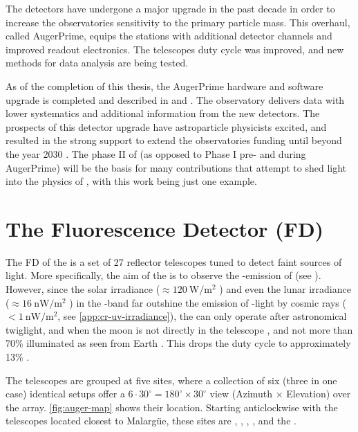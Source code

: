 The detectors have undergone a major upgrade in the past decade in order to 
increase the observatories sensitivity to the primary particle mass. This 
overhaul, called AugerPrime, equips the \SD stations with additional detector 
channels and improved readout electronics. The \FD telescopes duty cycle was 
improved, and new methods for data analysis are being tested.

As of the completion of this thesis, the AugerPrime hardware and software 
upgrade is completed and described in  and 
\cite{collaborationPierreAugerObservatory2011}. The observatory delivers data 
with lower systematics and additional information from the new detectors. The 
prospects of this detector upgrade have astroparticle physicists excited, and 
resulted in the strong support to extend the observatories funding until beyond
the year 2030 \cite{castellinaOutcomeFinanceBoard2023}. The phase II of \DAQ (as
opposed to Phase I pre- and during AugerPrime) will be the basis for many 
contributions that attempt to shed light into the physics of \UHECRs, with this 
work being just one example.

\section{The Fluorescence Detector (FD)}
\label{sesee}

The \acf{FD} of the \PAO is a set of 27 reflector telescopes tuned to detect 
faint sources of \UV light. More specifically, the aim of the \FD is to observe
the \UV-emission of \EAS (see ). However, since the 
solar irradiance ($\approx\SI{120}{\watt\per\meter\squared}$ 
\cite{leanContributionUltravioletIrradiance1989}) and even the lunar irradiance 
($\approx\SI{16}{\nano\watt\per\meter\squared}$
\cite{snowAbsoluteUltravioletIrradiance2013}) in the \UV-band far outshine the 
emission of \UV-light by cosmic rays ($<\SI{1}{\nano\watt\per\meter\squared}$, 
see \cref{app:cr-uv-irradiance}), the \FD can only operate after astronomical 
twiglight, and when the moon is not directly in the telescope \FOV, and not
more than 70\% illuminated as seen from Earth \cite{mathesCriteriaFDShift}. This
drops the duty cycle to approximately 13\% 
\cite{abrahamFluorescenceDetectorPierre2010}.

The telescopes are grouped at five \FD sites, where a collection of six (three
in one case) identical setups offer a $6\cdot30^\circ=180^\circ\times30^\circ$ 
view (Azimuth $\times$ Elevation) over the \SD array. \cref{fig:auger-map} shows
their location. Starting anticlockwise with the telescopes located closest to 
Malargüe, these sites are \LL, \LM, \LA, \CO, and the \HEAT.

